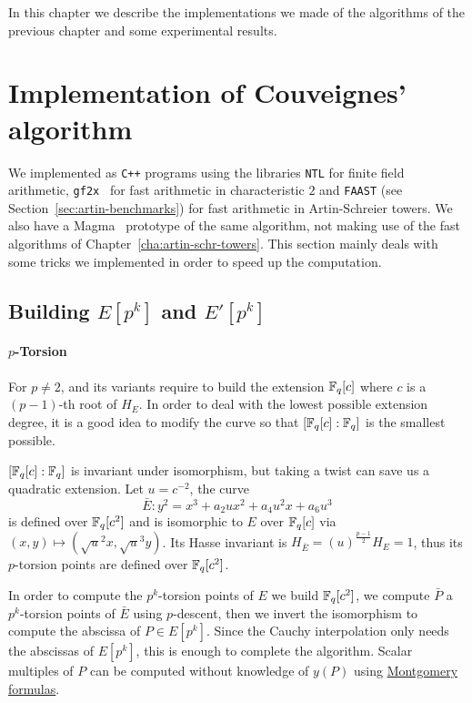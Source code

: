 

In this chapter we describe the implementations we made of the
algorithms of the previous chapter and some experimental results.

\section{Implementation of Couveignes' algorithm}
\label{sec:implementation}

We implemented \ctwoasfimc{} as \texttt{C++} programs using the
libraries \texttt{NTL} \cite{shoup2003ntl} for finite field
arithmetic, \texttt{gf2x}~\cite{gf2x} for fast arithmetic in
characteristic $2$ and \texttt{FAAST} (see
Section~\ref{sec:artin-benchmarks}) for fast arithmetic in
Artin-Schreier towers.  We also have a Magma~\cite{MAGMA} prototype of
the same algorithm, not making use of the fast algorithms of
Chapter~\ref{cha:artin-schr-towers}.  This section mainly deals with
some tricks we implemented in order to speed up the computation.

\subsection{Building \texorpdfstring{$E[p^k]$}{E[pk]} and \texorpdfstring{$E'[p^k]$}{E[pk]}}
\label{sec:impl:torsion}

\paragraph{$p$-Torsion}
For $p\ne2$, \ctwo{} and its variants require to build the extension
$\mathbb{F}_q[c]$ where $c$ is a $(p-1)$-th root of $H_E$. In order to deal with
the lowest possible extension degree, it is a good idea to modify the
curve so that $[\mathbb{F}_q[c]:\mathbb{F}_q]$ is the smallest possible.

$[\mathbb{F}_q[c]:\mathbb{F}_q]$ is invariant under isomorphism, but taking a twist
can save us a quadratic extension. Let $u=c^{-2}$, the curve
\begin{equation*}
  \bar{E} : y^2 = x^3 + a_2ux^2 + a_4u^2x + a_6u^3
\end{equation*}
is defined over $\mathbb{F}_q[c^2]$ and is isomorphic to $E$ over $\mathbb{F}_q[c]$
via $(x,y)\mapsto(\sqrt{u}^2x,\sqrt{u}^3y)$. Its Hasse invariant is
$H_{\bar{E}} = (u)^{\frac{p-1}{2}}H_E = 1$, thus its $p$-torsion
points are defined over $\mathbb{F}_q[c^2]$.

In order to compute the $p^k$-torsion points of $E$ we build
$\mathbb{F}_q[c^2]$, we compute $\bar{P}$ a $p^k$-torsion points of $\bar{E}$
using $p$-descent, then we invert the isomorphism to compute the
abscissa of $P\in E[p^k]$. Since the Cauchy interpolation only needs
the abscissas of $E[p^k]$, this is enough to complete the
algorithm. Scalar multiples of $P$ can be computed without knowledge
of $y(P)$ using \hyperref[rk:montgomery]{Montgomery formulas}.

